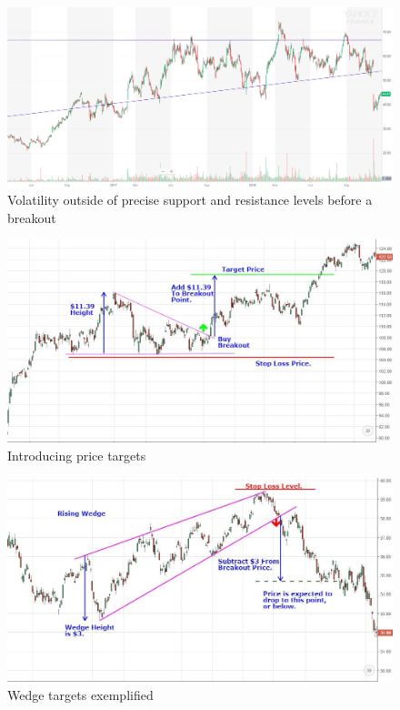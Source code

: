 \documentclass{article}
\begin{document}
\vspace{10pt}

\begin{figure}[!htb]
    \centering
    \includegraphics[width=\textwidth]{imgs/48.png}
    \caption{Volatility outside of precise support and resistance levels before a breakout}
\end{figure}

\vspace{10pt}

\begin{figure}[!htb]
    \centering
    \includegraphics[width=\textwidth]{imgs/49.png}
    \caption{Introducing price targets}
\end{figure}

\vspace{10pt}

\begin{figure}[!htb]
    \centering
    \includegraphics[width=\textwidth]{imgs/50.png}
    \caption{Wedge targets exemplified}
\end{figure}
\end{document}
